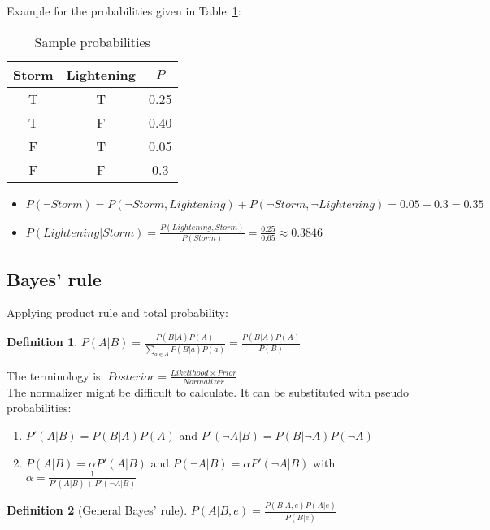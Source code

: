 \documentclass{report}
\newtheorem{definition}{Definition}[section]
\begin{document}
Example for the probabilities given in Table~\ref{table:sampleprobabilities}:
\begin{table}[h!]
\begin{center}
\begin{tabular}{c|c||c}
Storm & Lightening & $P$ \\
\hline
\hline
T & T & 0.25 \\
T & F & 0.40 \\
F & T & 0.05 \\
F & F & 0.3
\end{tabular}
\end{center}
\caption{Sample probabilities}
\label{table:sampleprobabilities}
\end{table}

\begin{itemize}
\item $P(\neg Storm) = P(\neg Storm, Lightening) + P(\neg Storm, \neg Lightening) = 0.05 + 0.3 = 0.35$
\item $P(Lightening\vert Storm) = \frac{P(Lightening, Storm)}{P(Storm)} = \frac{0.25}{0.65} \approx 0.3846$
\end{itemize}

\subsection{Bayes' rule}
\label{chapter:bayesrule}
Applying product rule and total probability:
\begin{definition}
$P(A\vert B) = \frac{P(B\vert A)P(A)}{\sum_{a\in A}{P(B\vert a)P(a)}} = \frac{P(B\vert A)P(A)}{P(B)}$
\end{definition}

The terminology is: $Posterior = \frac{Likelihood\times Prior}{Normalizer}$\\

The normalizer might be difficult to calculate. It can be substituted with pseudo probabilities:
\begin{enumerate}
\item $P'(A\vert B) = P(B\vert A)P(A)$ and $P'(\neg A\vert B) = P(B\vert \neg A)P(\neg A)$
\item $P(A\vert B) = \alpha P'(A\vert B)$ and $P(\neg A\vert B) = \alpha P'(\neg A\vert B)$ with $\alpha = \frac{1}{P'(A\vert B) + P'(\neg A\vert B)}$
\end{enumerate}

\begin{definition}[General Bayes' rule]
$P(A\vert B,e) = \frac{P(B\vert A,e)P(A\vert e)}{P(B\vert e)}$
\end{definition}
\end{document}
